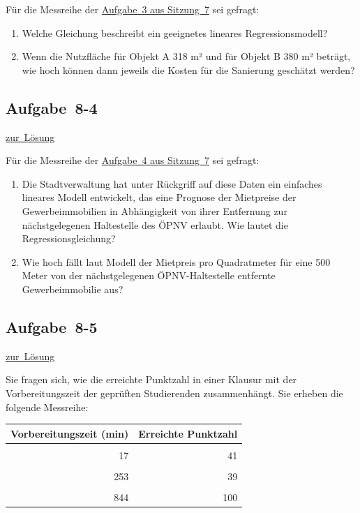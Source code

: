 \documentclass[
  11pt,
  ngerman,
  a4paper,
]{report}
\begin{document}
Für die Messreihe der \protect\hyperlink{aufgabe-7-3}{Aufgabe~3 aus Sitzung~7} sei gefragt:

\begin{enumerate}
\def\labelenumi{\alph{enumi})}
\item
  Welche Gleichung beschreibt ein geeignetes lineares Regressionsmodell?
\item
  Wenn die Nutzfläche für Objekt A 318 m² und für Objekt B 380 m² beträgt, wie hoch können dann jeweils die Kosten für die Sanierung geschätzt werden?
\end{enumerate}

\hypertarget{aufgabe-8-4}{%
\subsection{Aufgabe~8-4}\label{aufgabe-8-4}}

\protect\hyperlink{loesung-8-4}{zur~Lösung}

Für die Messreihe der \protect\hyperlink{aufgabe-7-4}{Aufgabe~4 aus Sitzung~7} sei gefragt:

\begin{enumerate}
\def\labelenumi{\alph{enumi})}
\item
  Die Stadtverwaltung hat unter Rückgriff auf diese Daten ein einfaches lineares Modell entwickelt, das eine Prognose der Mietpreise der Gewerbeimmobilien in Abhängigkeit von ihrer Entfernung zur nächstgelegenen Haltestelle des ÖPNV erlaubt. Wie lautet die Regressionsgleichung?
\item
  Wie hoch fällt laut Modell der Mietpreis pro Quadratmeter für eine 500 Meter von der nächstgelegenen ÖPNV-Haltestelle entfernte Gewerbeimmobilie aus?
\end{enumerate}

\hypertarget{aufgabe-8-5}{%
\subsection{Aufgabe~8-5}\label{aufgabe-8-5}}

\protect\hyperlink{loesung-8-5}{zur~Lösung}

Sie fragen sich, wie die erreichte Punktzahl in einer Klausur mit der Vorbereitungszeit der geprüften Studierenden zusammenhängt. Sie erheben die folgende Messreihe:

\begin{table}
\centering
\begin{tabular}{rr}
\toprule
\textbf{Vorbereitungszeit (min)} & \textbf{Erreichte Punktzahl}\\
\midrule
\cellcolor{gray!6}{834} & \cellcolor{gray!6}{88}\\
17 & 41\\
\cellcolor{gray!6}{519} & \cellcolor{gray!6}{75}\\
253 & 39\\
\cellcolor{gray!6}{739} & \cellcolor{gray!6}{77}\\
844 & 100\\
\bottomrule
\end{tabular}
\end{table}
\end{document}
